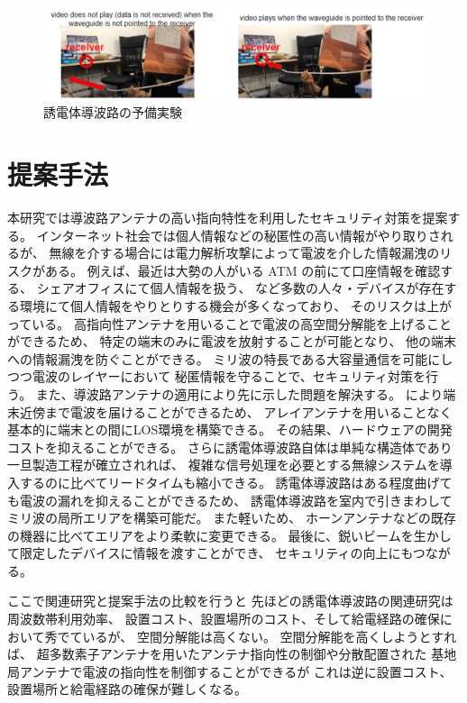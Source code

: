 \documentclass[technicalreport]{ieicej}
\begin{document}
\begin{figure}[t]
  \begin{center}
    \includegraphics[bb=0 0 630.087950 152.271255, width=1.0\linewidth]{img/qualitative_experiment.pdf}
    \caption{誘電体導波路の予備実験}
    \label{fig:qualitative_experiment}
  \end{center}
\end{figure}


\section{提案手法}

本研究では導波路アンテナの高い指向特性を利用したセキュリティ対策を提案する。
インターネット社会では個人情報などの秘匿性の高い情報がやり取りされるが、
無線を介する場合には電力解析攻撃によって電波を介した情報漏洩のリスクがある。
例えば、最近は大勢の人がいる ATM の前にて口座情報を確認する、
シェアオフィスにて個人情報を扱う、
など多数の人々・デバイスが存在する環境にて個人情報をやりとりする機会が多くなっており、
そのリスクは上がっている。
高指向性アンテナを用いることで電波の高空間分解能を上げることができるため、
特定の端末のみに電波を放射することが可能となり、
他の端末への情報漏洩を防ぐことができる。
ミリ波の特長である大容量通信を可能にしつつ電波のレイヤーにおいて
秘匿情報を守ることで、セキュリティ対策を行う。
また、導波路アンテナの適用により先に示した問題を解決する。
により端末近傍まで電波を届けることができるため、
アレイアンテナを用いることなく基本的に端末との間にLOS環境を構築できる。
その結果、ハードウェアの開発コストを抑えることができる。
さらに誘電体導波路自体は単純な構造体であり一旦製造工程が確立されれば、
複雑な信号処理を必要とする無線システムを導入するのに比べてリードタイムも縮小できる。
誘電体導波路はある程度曲げても電波の漏れを抑えることができるため、
誘電体導波路を室内で引きまわしてミリ波の局所エリアを構築可能だ。
また軽いため、
ホーンアンテナなどの既存の機器に比べてエリアをより柔軟に変更できる。
最後に、鋭いビームを生かして限定したデバイスに情報を渡すことができ、
セキュリティの向上にもつながる。


ここで関連研究と提案手法の比較を行うと
先ほどの誘電体導波路の関連研究は周波数帯利用効率、
設置コスト、設置場所のコスト、そして給電経路の確保において秀でているが、
空間分解能は高くない。
空間分解能を高くしようとすれば、
超多数素子アンテナを用いたアンテナ指向性の制御や分散配置された
基地局アンテナで電波の指向性を制御することができるが
これは逆に設置コスト、設置場所と給電経路の確保が難しくなる。
\end{document}

